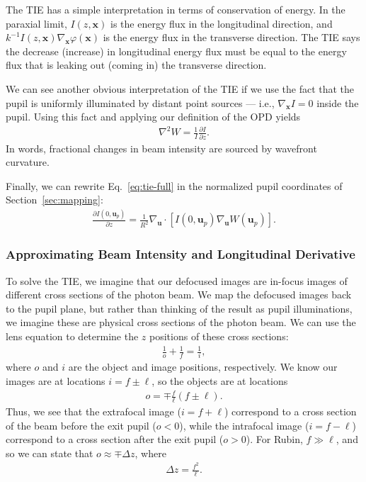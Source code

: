 \documentclass[TS,authoryear,toc]{lsstdoc}
\begin{document}
The TIE has a simple interpretation in terms of conservation of energy.
In the paraxial limit, $I(z, \mathbf{x})$ is the energy flux in the longitudinal direction, and $k^{-1} I(z, \mathbf{x}) \nabla_\mathbf{x} \varphi(\mathbf{x})$ is the energy flux in the transverse direction.
The TIE says the decrease (increase) in longitudinal energy flux must be equal to the energy flux that is leaking out (coming in) the transverse direction.

We can see another obvious interpretation of the TIE if we use the fact that the pupil is uniformly illuminated by distant point sources --- i.e., $\nabla_\mathbf{x} I = 0$ inside the pupil.
Using this fact and applying our definition of the OPD yields
\begin{align}
    \nabla^2 W = \frac{1}{I} \frac{\partial I}{\partial z}.
\end{align}
In words, fractional changes in beam intensity are sourced by wavefront curvature. 

Finally, we can rewrite Eq.~\ref{eq:tie-full} in the normalized pupil coordinates of Section~\ref{sec:mapping}:
\begin{align}
    \frac{\partial I(0, \mathbf{u}_p)}{\partial z} = 
    \frac{1}{R^2} \nabla_\mathbf{u} \cdot [I(0, \mathbf{u}_p) \nabla_\mathbf{u} W(\mathbf{u}_p)].
\end{align}


\subsubsection{Approximating Beam Intensity and Longitudinal Derivative}
\label{sec:approx-I-dIdz}

To solve the TIE, we imagine that our defocused images are in-focus images of different cross sections of the photon beam.
We map the defocused images back to the pupil plane, but rather than thinking of the result as pupil illuminations, we imagine these are physical cross sections of the photon beam.
We can use the lens equation to determine the $z$ positions of these cross sections:
\begin{align}
    \frac{1}{o} + \frac{1}{f} = \frac{1}{i},
\end{align}
where $o$ and $i$ are the object and image positions, respectively.
We know our images are at locations $i = f \pm \ell$, so the objects are at locations
\begin{align}
    o = \mp \frac{f}{\ell}(f \pm \ell).
\end{align}
Thus, we see that the extrafocal image ($i = f + \ell$) correspond to a cross section of the beam before the exit pupil ($o<0$), while the intrafocal image ($i = f - \ell$) correspond to a cross section after the exit pupil ($o>0$).
For Rubin, $f \gg \ell$, and so we can state that $o \approx \mp \Delta z$, where
\begin{align}
    \Delta z = \frac{f^2}{\ell}.
\end{align}
\end{document}
